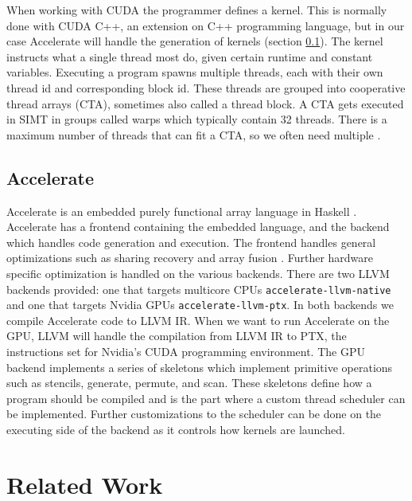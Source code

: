 \documentclass{article}
\begin{document}
When working with CUDA the programmer defines a kernel.
This is normally done with CUDA C++, an extension on C++ programming language, but in our case Accelerate will handle the generation of kernels (section \ref{sec:accelerate}).
The kernel instructs what a single thread most do, given certain runtime and constant variables.
Executing a program spawns multiple threads, each with their own thread id and corresponding block id.
These threads are grouped into cooperative thread arrays (CTA), sometimes also called a thread block.
A CTA gets executed in SIMT in groups called warps which typically contain 32 threads.
There is a maximum number of threads that can fit a CTA, so we often need multiple \cite{nvidia2021cudadocs}.


\subsection{Accelerate}
\label{sec:accelerate}
Accelerate is an embedded purely functional array language in Haskell \cite{chakravarty2011accelerating}.
Accelerate has a frontend containing the embedded language, and the backend which handles code generation and execution.
The frontend handles general optimizations such as sharing recovery and array fusion \cite{mcdonell2013optimising,balen2020optimal}.
Further hardware specific optimization is handled on the various backends.
There are two LLVM \cite{llvm} backends provided: one that targets multicore CPUs \texttt{accelerate-llvm-native} and one that targets Nvidia GPUs \texttt{accelerate-llvm-ptx}.
In both backends we compile Accelerate code to LLVM IR.
When we want to run Accelerate on the GPU, LLVM will handle the compilation from LLVM IR to PTX, the instructions set for Nvidia's CUDA programming environment\cite{mcdonell2015type, llvm, nvidia2021cudadocs}.
The GPU backend implements a series of skeletons which implement primitive operations such as stencils, generate, permute, and scan.
These skeletons define how a program should be compiled and is the part where a custom thread scheduler can be implemented.
Further customizations to the scheduler can be done on the executing side of the backend as it controls how kernels are launched.

\section{Related Work}
\end{document}
